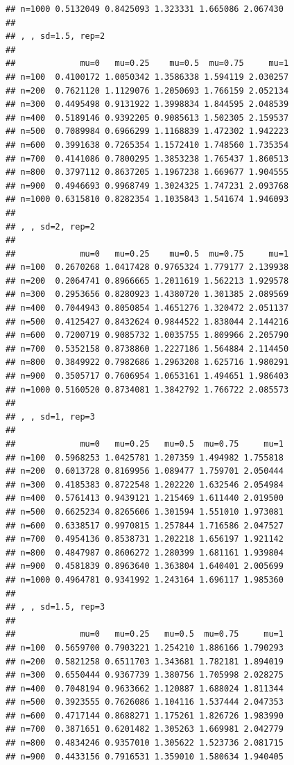\documentclass[11pt,a4paper]{article}
\begin{document}
\begin{verbatim}
## n=1000 0.5132049 0.8425093 1.323331 1.665086 2.067430
## 
## , , sd=1.5, rep=2
## 
##             mu=0   mu=0.25    mu=0.5  mu=0.75     mu=1
## n=100  0.4100172 1.0050342 1.3586338 1.594119 2.030257
## n=200  0.7621120 1.1129076 1.2050693 1.766159 2.052134
## n=300  0.4495498 0.9131922 1.3998834 1.844595 2.048539
## n=400  0.5189146 0.9392205 0.9085613 1.502305 2.159537
## n=500  0.7089984 0.6966299 1.1168839 1.472302 1.942223
## n=600  0.3991638 0.7265354 1.1572410 1.748560 1.735354
## n=700  0.4141086 0.7800295 1.3853238 1.765437 1.860513
## n=800  0.3797112 0.8637205 1.1967238 1.669677 1.904555
## n=900  0.4946693 0.9968749 1.3024325 1.747231 2.093768
## n=1000 0.6315810 0.8282354 1.1035843 1.541674 1.946093
## 
## , , sd=2, rep=2
## 
##             mu=0   mu=0.25    mu=0.5  mu=0.75     mu=1
## n=100  0.2670268 1.0417428 0.9765324 1.779177 2.139938
## n=200  0.2064741 0.8966665 1.2011619 1.562213 1.929578
## n=300  0.2953656 0.8280923 1.4380720 1.301385 2.089569
## n=400  0.7044943 0.8050854 1.4651276 1.320472 2.051137
## n=500  0.4125427 0.8432624 0.9844522 1.838044 2.144216
## n=600  0.7200719 0.9085732 1.0035755 1.809966 2.205790
## n=700  0.5352158 0.8738860 1.2227186 1.564884 2.114450
## n=800  0.3849922 0.7982686 1.2963208 1.625716 1.980291
## n=900  0.3505717 0.7606954 1.0653161 1.494651 1.986403
## n=1000 0.5160520 0.8734081 1.3842792 1.766722 2.085573
## 
## , , sd=1, rep=3
## 
##             mu=0   mu=0.25   mu=0.5  mu=0.75     mu=1
## n=100  0.5968253 1.0425781 1.207359 1.494982 1.755818
## n=200  0.6013728 0.8169956 1.089477 1.759701 2.050444
## n=300  0.4185383 0.8722548 1.202220 1.632546 2.054984
## n=400  0.5761413 0.9439121 1.215469 1.611440 2.019500
## n=500  0.6625234 0.8265606 1.301594 1.551010 1.973081
## n=600  0.6338517 0.9970815 1.257844 1.716586 2.047527
## n=700  0.4954136 0.8538731 1.202218 1.656197 1.921142
## n=800  0.4847987 0.8606272 1.280399 1.681161 1.939804
## n=900  0.4581839 0.8963640 1.363804 1.640401 2.005699
## n=1000 0.4964781 0.9341992 1.243164 1.696117 1.985360
## 
## , , sd=1.5, rep=3
## 
##             mu=0   mu=0.25   mu=0.5  mu=0.75     mu=1
## n=100  0.5659700 0.7903221 1.254210 1.886166 1.790293
## n=200  0.5821258 0.6511703 1.343681 1.782181 1.894019
## n=300  0.6550444 0.9367739 1.380756 1.705998 2.028275
## n=400  0.7048194 0.9633662 1.120887 1.688024 1.811344
## n=500  0.3923555 0.7626086 1.104116 1.537444 2.047353
## n=600  0.4717144 0.8688271 1.175261 1.826726 1.983990
## n=700  0.3871651 0.6201482 1.305263 1.669981 2.042779
## n=800  0.4834246 0.9357010 1.305622 1.523736 2.081715
## n=900  0.4433156 0.7916531 1.359010 1.580634 1.940405

\end{verbatim}
\end{document}
